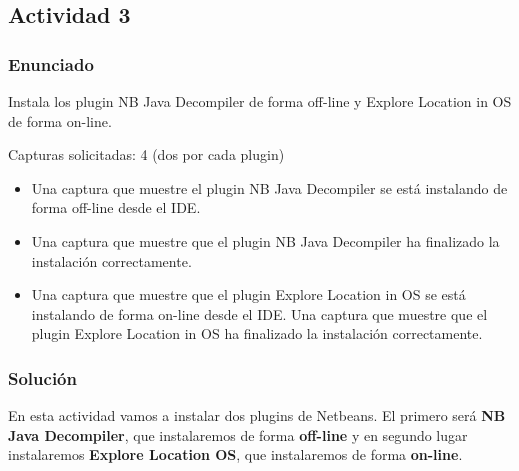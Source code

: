 \subsection{Actividad 3}
\subsubsection{Enunciado}
Instala los plugin NB Java Decompiler de forma off-line y Explore Location in OS de forma on-line.

Capturas solicitadas: 4 (dos por cada plugin)
\begin{itemize}
    \item Una captura que muestre el plugin NB Java Decompiler se está instalando de forma off-line desde el IDE.
    \item Una captura que muestre que el plugin NB Java Decompiler ha finalizado la instalación correctamente.
    \item Una captura que muestre que el plugin Explore Location in OS se está instalando de forma on-line desde el IDE.
    Una captura que muestre que el plugin Explore Location in OS ha finalizado la instalación correctamente.
\end{itemize}

\subsubsection{Solución}
En esta actividad vamos a instalar dos plugins de Netbeans. El primero será \textbf{NB Java Decompiler}, que instalaremos de forma \textbf{off-line} y en segundo lugar instalaremos \textbf{Explore Location OS}, que instalaremos de forma \textbf{on-line}.

